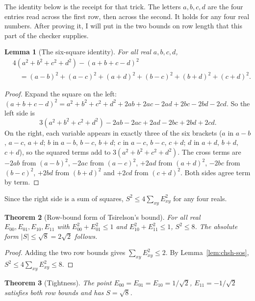 \documentclass[11pt,twoside]{article}
\theoremstyle{thielethm}
\newtheorem{theorem}{Theorem}[section]
\newtheorem{lemma}[theorem]{Lemma}
\theoremstyle{thieledef}
\theoremstyle{thieledef}
\theoremstyle{thieledef}
\theoremstyle{thielethm}
\theoremstyle{thieleobs}
\theoremstyle{thielethm}
\begin{document}
The identity below is the receipt for that trick. The letters $a,b,c,d$ are
the four entries read across the first row, then across the second. It holds
for any four real numbers. After proving it, I will put in the two bounds
on row length that this part of the checker supplies.

\begin{lemma}[The six-square identity]
For all real $a, b, c, d$,
\[
\begin{aligned}
&4(a^2 + b^2 + c^2 + d^2) - (a + b + c - d)^2 \\
&\quad = (a-b)^2 + (a-c)^2 + (a+d)^2 + (b-c)^2 + (b+d)^2 + (c+d)^2.
\end{aligned}
\]

\end{lemma}

\begin{proof}
Expand the square on the left:
$(a+b+c-d)^2 = a^2 + b^2 + c^2 + d^2 + 2ab + 2ac - 2ad + 2bc - 2bd - 2cd$. So the left side is
\[
3(a^2 + b^2 + c^2 + d^2) - 2ab - 2ac + 2ad - 2bc + 2bd + 2cd.
\]
On the right, each variable appears in exactly three of the six brackets ($a$ in
$a-b$, $a-c$, $a+d$; $b$ in $a-b$, $b-c$, $b+d$; $c$ in $a-c$, $b-c$, $c+d$; $d$ in $a+d$,
$b+d$, $c+d$), so the squared terms add to $3(a^2+b^2+c^2+d^2)$. The cross terms are
$-2ab$ from $(a-b)^2$, $-2ac$ from $(a-c)^2$, $+2ad$ from $(a+d)^2$, $-2bc$ from $(b-c)^2$,
$+2bd$ from $(b+d)^2$ and $+2cd$ from $(c+d)^2$. Both sides agree term by term.
\end{proof}

Since the right side is a sum of squares, $S^2 \le 4 \sum_{xy} E_{xy}^2$ for any four reals.

\begin{theorem}[Row-bound form of Tsirelson's bound]
For all real $E_{00}, E_{01}, E_{10}, E_{11}$ with $E_{00}^2 + E_{01}^2 \le 1$ and
$E_{10}^2 + E_{11}^2 \le 1$, $S^2 \le 8$. The absolute form $|S| \le \sqrt 8 = 2\sqrt 2$ follows.
\end{theorem}

\begin{proof}
Adding the two row bounds gives $\sum_{xy} E_{xy}^2 \le 2$. By Lemma~\ref{lem:chsh-sos},
$S^2 \le 4 \sum_{xy} E_{xy}^2 \le 8$.
\end{proof}

\begin{theorem}[Tightness]
The point $E_{00} = E_{01} = E_{10} = 1/\sqrt 2$, $E_{11} = -1/\sqrt 2$ satisfies both row
bounds and has $S = \sqrt 8$.
\end{theorem}
\end{document}

